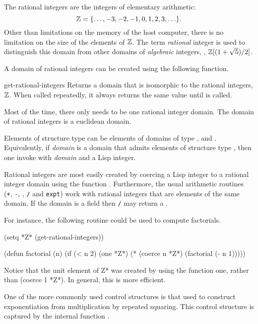 The rational integers are the integers of elementary arithmetic:
\[
{\Bbb Z} = \{\ldots, -3, -2, -1, 0, 1, 2, 3, \ldots\}.
\]
Other than limitations on the memory of the host computer, there is no
limitation on the size of the elements of ${\Bbb Z}$.  The term {\em
rational} integer is used to distinguish this domain from other
domains of {\em algebraic} integers, \eg, ${\Bbb Z}[(1+\sqrt{5})/2]$.

A domain of rational integers can be created using the following function.

\begin{functiondef}{get-rational-integers}{}
Returns a domain that is isomorphic to the rational integers, ${\Bbb Z}$.
When called repeatedly, it always returns the same value until
 is called. 
\end{functiondef}

\noindent
Most of the time, there only needs to be one rational integer domain.
The domain of rational integers is a euclidean domain.

Elements of structure type  can be elements
of domains of type , 
and .  Equivalently, if {\em domain} is a
domain that admits elements of structure type
, then one invoke 
with {\em domain} and a Lisp integer.

\medskip
Rational integers are most easily created by coercing a Lisp integer
to a rational integer domain using the function .
Furthermore, the usual arithmetic routines ({\tt +}, {\tt -}, {\tt *},
{\tt /} and {\tt expt}) work with rational integers that are 
elements of the same domain.  If the domain is a field then {\tt /}
may return a . 

For instance, the following routine could be used to compute
factorials.
\begin{code}
(setq *Z* (get-rational-integers)) 

(defun factorial (n)
  (if (< n 2) (one *Z*)
      (* (coerce n *Z*) (factorial (- n 1)))))
\end{code}

\noindent
Notice that the unit element of {\sf *Z*} was created by using the
function {\sf one}, rather than {\sf (coerce 1 *Z*)}.  In general,
this is more efficient. 

One of the more commonly used control structures is that used to
construct exponentiation from multiplication by repeated squaring.
This control structure is captured by the internal function
. 

